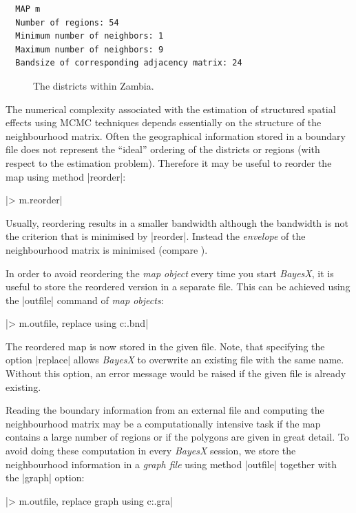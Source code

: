 \begin{verbatim}
  MAP m
  Number of regions: 54
  Minimum number of neighbors: 1
  Maximum number of neighbors: 9
  Bandsize of corresponding adjacency matrix: 24
\end{verbatim}

\begin{figure}[ht]
\begin{center}
 {\it\caption{The
districts within Zambia.\label{mcmc:zambiamap}}}
\end{center}
\end{figure}


The numerical complexity associated with the estimation of structured spatial effects using MCMC techniques depends essentially
on the structure of the neighbourhood matrix. Often the geographical information stored in a boundary file does not represent
the ``ideal'' ordering of the districts or regions (with respect to the estimation problem). Therefore it may be useful to
reorder the map using method |reorder|:

|> m.reorder|

Usually, reordering results in a smaller bandwidth although the bandwidth is not the criterion that is minimised by |reorder|.
Instead the {\it envelope} of the neighbourhood matrix is minimised (compare ).

In order to avoid reordering the {\it map object} every time you start {\it BayesX}, it is useful to store the reordered
version in a separate file. This can be achieved using the |outfile| command of {\it map objects}:

|> m.outfile, replace using c:\data\zambiasort.bnd|

The reordered map is now stored in the given file. Note, that specifying the option |replace| allows {\it BayesX} to overwrite
an existing file with the same name. Without this option, an error message would be raised if the given file is already
existing.

Reading the boundary information from an external file and computing the neighbourhood matrix may be a computationally
intensive task if the map contains a large number of regions or if the polygons are given in great detail. To avoid doing these
computation in every {\it BayesX} session, we store the neighbourhood information in a {\it graph file} using method |outfile|
together with the |graph| option:

|> m.outfile, replace graph using c:\data\zambiasort.gra|

